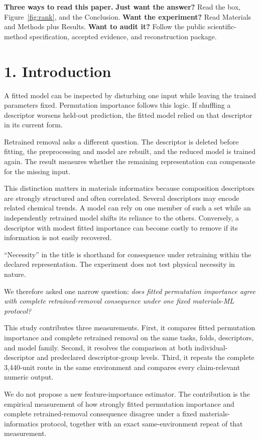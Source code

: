 \documentclass[10pt,a4paper]{article}
\begin{document}
\noindent\textbf{Three ways to read this paper.} \textbf{Just want the answer?} Read the box, Figure~\ref{fig:rank}, and the Conclusion. \textbf{Want the experiment?} Read Materials and Methods plus Results. \textbf{Want to audit it?} Follow the public scientific-method specification, accepted evidence, and reconstruction package.

\section{1. Introduction}
A fitted model can be inspected by disturbing one input while leaving the trained parameters fixed. Permutation importance follows this logic. If shuffling a descriptor worsens held-out prediction, the fitted model relied on that descriptor in its current form.

Retrained removal asks a different question. The descriptor is deleted before fitting, the preprocessing and model are rebuilt, and the reduced model is trained again. The result measures whether the remaining representation can compensate for the missing input.

This distinction matters in materials informatics because composition descriptors are strongly structured and often correlated. Several descriptors may encode related chemical trends. A model can rely on one member of such a set while an independently retrained model shifts its reliance to the others. Conversely, a descriptor with modest fitted importance can become costly to remove if its information is not easily recovered.

``Necessity'' in the title is shorthand for consequence under retraining within the declared representation. The experiment does not test physical necessity in nature.

We therefore asked one narrow question: \emph{does fitted permutation importance agree with complete retrained-removal consequence under one fixed materials-ML protocol?}

This study contributes three measurements. First, it compares fitted permutation importance and complete retrained removal on the same tasks, folds, descriptors, and model family. Second, it resolves the comparison at both individual-descriptor and predeclared descriptor-group levels. Third, it repeats the complete 3,440-unit route in the same environment and compares every claim-relevant numeric output.

We do not propose a new feature-importance estimator. The contribution is the empirical measurement of how strongly fitted permutation importance and complete retrained-removal consequence disagree under a fixed materials-informatics protocol, together with an exact same-environment repeat of that measurement.
\end{document}
